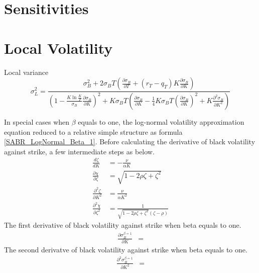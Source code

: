 \documentclass{article}
\begin{document}
\section{Sensitivities}



\section{Local Volatility}

Local variance
\begin{equation}
    \sigma_{L}^2 = \frac{\sigma_{B}^2 + 2 \sigma_{B} T \left(\frac{\partial \sigma_{B}}{\partial T} + (r_T - q_T) K \frac{\partial \sigma_{B}}{\partial K}\right)}{\left(1 - \frac{K \ln{\frac{K}{F}}}{\sigma_{B}} \frac{\partial \sigma_{B}}{\partial K}\right)^2 + K \sigma_{B} T \left(\frac{\partial \sigma_{B}}{\partial K} - \frac{1}{4} K \sigma_{B} T \left(\frac{\partial \sigma_{B}}{\partial K}\right)^2 + K \frac{\partial^2 \sigma_{B}}{\partial K^2}\right)}
\end{equation}

In special cases when $ \beta $ equals to one, the log-normal volatility approximation equation reduced to a relative simple structure as formula \ref{SABR_LogNormal_Beta_1}.
Before calculating the derivative of black volatility against strike, a few intermediate steps as below.
\begin{subequations}
    \begin{align}
        \frac{d \zeta}{d K} &= -\frac{\nu}{\alpha K} \\
        \frac{\partial \chi}{\partial \zeta} &= \sqrt{1 - 2 \rho \zeta + \zeta^2}\\
        \frac{\partial^2 \zeta}{\partial K^2} &= \frac{\nu}{\alpha K^2}\\
        \frac{\partial^2 \chi}{\partial \zeta^2} &= \frac{1}{\sqrt{1 - 2 \rho \zeta + \zeta^2} \left(\zeta - \rho\right)}
    \end{align}
\end{subequations}
The first derivative of black volatility against strike when beta equals to one.
\begin{align} \label{dSigdK}
    \frac{\partial \sigma_{B}^{\beta=1}}{\partial K} &= 
\end{align}
The second derivatve of black volatility against strike when beta equals to one.
\begin{align} \label{dSig2dK2}
    \frac{\partial^2 \sigma_{B}^{\beta=1}}{\partial K^2} &=
\end{align}
\end{document}
